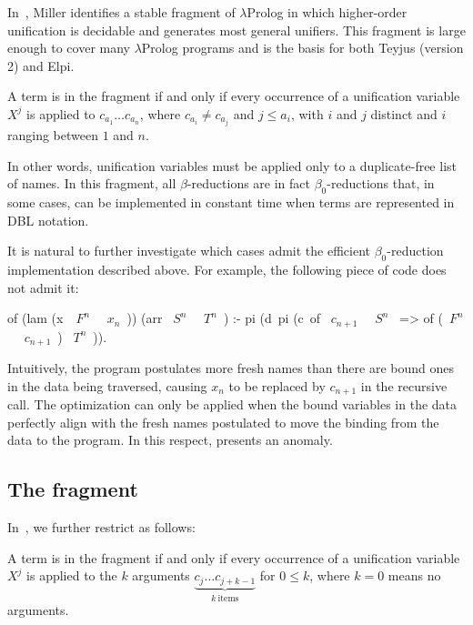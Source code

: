 \documentclass{these-ISSS}
\newenvironment{elpicode}
  {\VerbatimEnvironment\begin{elpibox}\begin{xelpicode}}{\end{xelpicode}
\end{elpibox}}
\begin{document}
In~\cite{10.1093/logcom/1.4.497}, Miller identifies a stable fragment of
$\lambda$Prolog in which higher-order unification is decidable and generates
most general unifiers. This fragment is large enough to cover many
$\lambda$Prolog programs and is the basis for both Teyjus (version 2) and
Elpi.

\begin{definition}
A term is in the \theotherfragment fragment if and only if every occurrence of
a unification variable $X^j$ is applied to $c_{a_1} \ldots c_{a_n}$, where
$c_{a_i} \neq c_{a_j}$ and $j \leq a_i$, with $i$ and $j$
distinct and $i$ ranging between $1$ and $n$.
\end{definition}

\noindent
In other words, unification variables must be applied only to a duplicate-free
list of names. In this fragment, all $\beta$-reductions are in fact
$\beta_0$-reductions that, in some cases, can be implemented in constant time
when terms are represented in DBL notation.


It is natural to further investigate which cases admit the efficient
$\beta_0$-reduction implementation described above. For example, the following
piece of code does not admit it:

\begin{elpicode}
of (lam (x\ ~$F^n$~ ~$x_n$~)) (arr ~$S^n$~ ~$T^n$~) :-
  pi (d\ pi (c\ of ~$c_{n+1}$~ ~$S^n$~ => of (~$F^n$~ ~$c_{n+1}$~) ~$T^n$~)).
\end{elpicode}

\noindent
Intuitively, the program postulates more fresh names than there are bound ones
in the data being traversed, causing $x_n$ to be replaced by $c_{n+1}$ in the
recursive call. The optimization can only be applied when the bound variables
in the data perfectly align with the fresh names postulated to move the binding
from the data to the program. In this respect, 
presents an anomaly.

\subsection{The \thefragment fragment}\label{sec:llambo}


In~\cite{dunchev15lpar}, we further restrict \theotherfragment as follows:


\begin{definition}
A term is in the fragment \thefragment if and only if every
occurrence of a unification variable $X^j$ is applied to the $k$ arguments
$\underbrace{c_j \ldots c_{j + k-1}}_{k~\mathrm{items}}$ for $0 \leq k$,
where $k=0$ means no arguments.
\end{definition}
\end{document}
